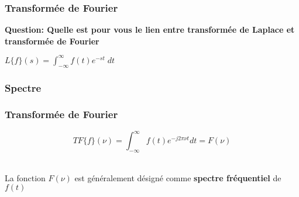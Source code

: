\documentclass{beamer}
\begin{document}
\begin{frame}
\frametitle{Transformée de Fourier}
\textbf{Question: Quelle est pour vous le lien entre transformée de Laplace et transformée de Fourier}\\
\vspace{1 cm}
{
\begin{center}
	$L\{f\}(s) = \displaystyle \int^{\infty}_{-\infty} f(t) e^{-st} \; dt $ \only<3->{$ \rightarrow TF\{ f \}(\nu) = \displaystyle \int^{\infty}_{-\infty} f(t) e^{-j2\pi \nu t} dt $}
\end{center} 
}

\end{frame}

\subsubsection{Spectre}
\begin{frame}
\frametitle{Transformée de Fourier}
\[ TF\{ f \}(\nu) = \displaystyle \int^{\infty}_{-\infty} f(t) e^{-j2\pi \nu t} dt   = F(\nu) \]\\
\vspace{1cm}

La fonction $F(\nu)$ est généralement désigné comme \textbf{spectre fréquentiel} de $f(t)$ \\

\vspace{1cm}

\end{frame}
\end{document}
